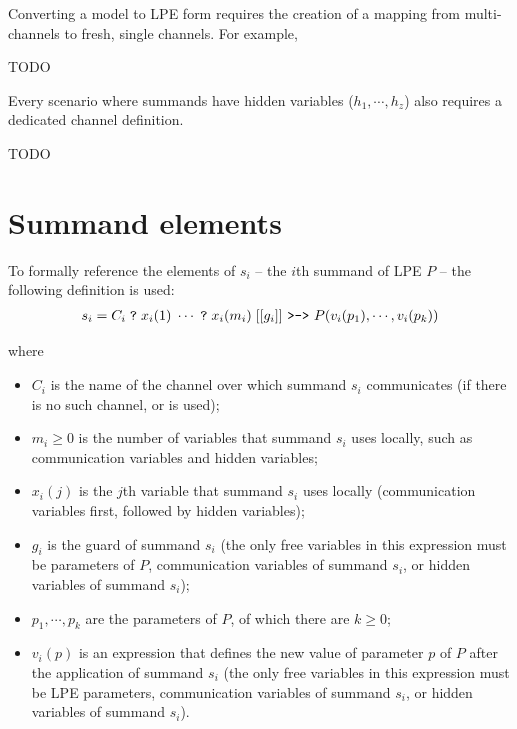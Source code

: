 Converting a model to LPE form requires the creation of a mapping from multi-channels to fresh, single channels.
For example,

TODO

Every scenario where summands have hidden variables ($h_1, \cdots{}, h_z$) also requires a dedicated channel definition.

TODO

\section{Summand elements} \label{summandelements}

To formally reference the elements of $s_i$ -- the $i$th summand of LPE $P$ -- the following definition is used:
\begin{align*}
s_i = C_i \; \texttt{?} \; x_i(1) \; \cdots{} \; \texttt{?} \; x_i(m_i) \; [[g_i]] \text{ \texttt{>->} } P(v_i(p_1), \cdots{}, v_i(p_k))
\end{align*}

where

\begin{itemize}
\item $C_i$ is the name of the channel over which summand $s_i$ communicates (if there is no such channel, \istep{} or \cistep{} is used);
\item $m_i \geq 0$ is the number of variables that summand $s_i$ uses locally, such as communication variables and hidden variables;
\item $x_i(j)$ is the $j$th variable that summand $s_i$ uses locally (communication variables first, followed by hidden variables);
\item $g_i$ is the guard of summand $s_i$ (the only free variables in this expression must be parameters of $P$, communication variables of summand $s_i$, or hidden variables of summand $s_i$);
\item $p_1, \cdots{}, p_k$ are the parameters of $P$, of which there are $k \geq 0$;
\item $v_i(p)$ is an expression that defines the new value of parameter $p$ of $P$ after the application of summand $s_i$ (the only free variables in this expression must be LPE parameters, communication variables of summand $s_i$, or hidden variables of summand $s_i$).
\end{itemize}


